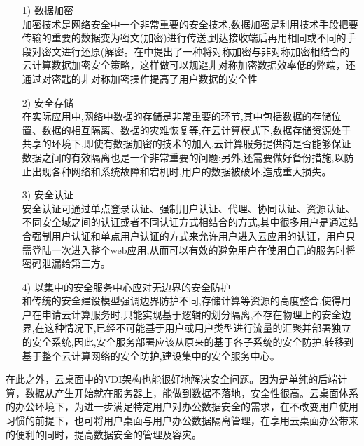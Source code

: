 \documentclass{article}
\begin{document}
\begin{itemize}
	\item [1) ]
	数据加密\\
  	 加密技术是网络安全中一个非常重要的安全技术,数据加密是利用技术手段把要传输的重要的数据变为密文(加密)进行传送,到达接收端后再用相同或不同的手段对密文进行还原(解密。在\citep{dd}中提出了一种将对称加密与非对称加密相结合的云计算数据加密安全策略，这样做可以规避非对称加密数据效率低的弊端，还通过对密匙的非对称加密操作提高了用户数据的安全性
	
	\item [2) ]安全存储\\
	在实际应用中,网络中数据的存储是非常重要的环节,其中包括数据的存储位置、数据的相互隔离、数据的灾难恢复等,在云计算模式下,数据存储资源处于共享的环境下,即使有数据加密的技术的加入,云计算服务提供商是否能够保证数据之间的有效隔离也是一个非常重要的问题:另外,还需要做好备份措施,以防止出现各种网络和系统故障和宕机时,用户的数据被破坏,造成重大损失。
	
	\item [3) ]安全认证\\
	安全认证可通过单点登录认证、强制用户认证、代理、协同认证、资源认证、不同安全域之间的认证或者不同认证方式相结合的方式,其中很多用户是通过结合强制用户认证和单点用户认证的方式来允许用户进入云应用的认证，用户只需登陆一次进入整个web应用,从而可以有效的避免用户在使用自己的服务时将密码泄漏给第三方。
	
    \item [4) ]以集中的安全服务中心应对无边界的安全防护\\
    和传统的安全建设模型强调边界防护不同,存储计算等资源的高度整合,使得用户在申请云计算服务时,只能实现基于逻辑的划分隔离,不存在物理上的安全边界,在这种情况下,已经不可能基于用户或用户类型进行流量的汇聚并部署独立的安全系统,因此,安全服务部署应该从原来的基于各子系统的安全防护,转移到基于整个云计算网络的安全防护,建设集中的安全服务中心。
\end{itemize}\par
在此之外，云桌面中的VDI架构也能很好地解决安全问题。\citep{ee}因为是单纯的后端计算，数据从产生开始就在服务器上，能做到数据不落地，安全性很高。云桌面体系的办公环境下，为进一步满足特定用户对办公数据安全的需求，在不改变用户使用习惯的前提下，也可将用户桌面与用户办公数据隔离管理，在享用云桌面办公带来的便利的同时，提高数据安全的管理及容灾。
\end{document}
